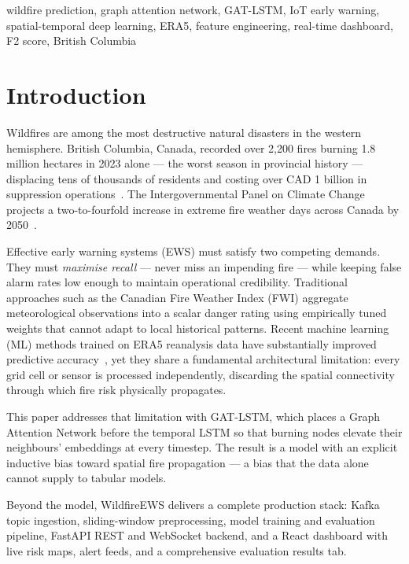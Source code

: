 \documentclass[conference]{IEEEtran}
\begin{document}
\begin{IEEEkeywords}
wildfire prediction, graph attention network, GAT-LSTM, IoT early warning,
spatial-temporal deep learning, ERA5, feature engineering, real-time dashboard,
F2 score, British Columbia
\end{IEEEkeywords}

\section{Introduction}
\label{sec:intro}

Wildfires are among the most destructive natural disasters in the western
hemisphere. British Columbia, Canada, recorded over 2,200 fires burning
1.8 million hectares in 2023 alone — the worst season in provincial
history — displacing tens of thousands of residents and costing over
CAD 1 billion in suppression operations~\cite{bcwildfire2023}. The
Intergovernmental Panel on Climate Change projects a two-to-fourfold increase
in extreme fire weather days across Canada by 2050~\cite{ipcc2021}.

Effective early warning systems (EWS) must satisfy two competing demands.
They must \emph{maximise recall} — never miss an impending fire — while
keeping false alarm rates low enough to maintain operational credibility.
Traditional approaches such as the Canadian Fire Weather Index (FWI)
aggregate meteorological observations into a scalar danger rating using
empirically tuned weights that cannot adapt to local historical patterns.
Recent machine learning (ML) methods trained on ERA5 reanalysis data have
substantially improved predictive accuracy~\cite{nasourinia2025}, yet they
share a fundamental architectural limitation: every grid cell or sensor is
processed independently, discarding the spatial connectivity through which
fire risk physically propagates.

This paper addresses that limitation with GAT-LSTM, which places a Graph
Attention Network before the temporal LSTM so that burning nodes elevate
their neighbours' embeddings at every timestep. The result is a model with
an explicit inductive bias toward spatial fire propagation — a bias that
the data alone cannot supply to tabular models.

Beyond the model, WildfireEWS delivers a complete production stack: Kafka
topic ingestion, sliding-window preprocessing, model training and evaluation
pipeline, FastAPI REST and WebSocket backend, and a React dashboard with live
risk maps, alert feeds, and a comprehensive evaluation results tab.
\end{document}
